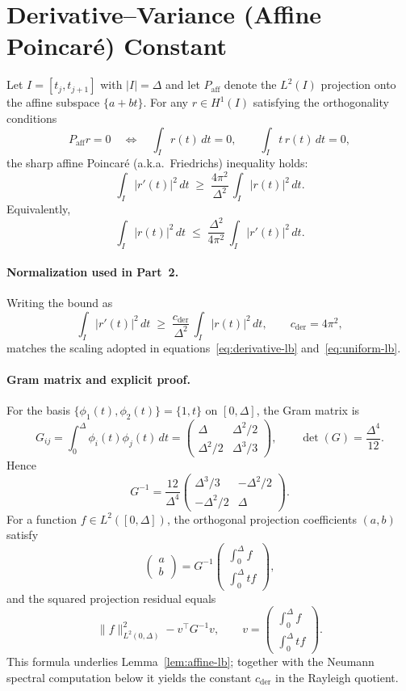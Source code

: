 \section{Derivative–Variance (Affine Poincaré) Constant}
\label{app:B}

Let $I=[t_j,t_{j+1}]$ with $|I|=\Delta$ and let $P_{\mathrm{aff}}$ denote the $L^2(I)$
projection onto the affine subspace $\{a+bt\}$. For any $r\in H^1(I)$ satisfying the
orthogonality conditions
\[
P_{\mathrm{aff}} r = 0
\quad\Longleftrightarrow\quad
\int_I r(t)\,dt=0,\qquad \int_I t\,r(t)\,dt=0,
\]
the sharp affine Poincaré (a.k.a.\ Friedrichs) inequality holds:
\begin{equation}
\int_I |r'(t)|^2\,dt \;\ge\; \frac{4\pi^2}{\Delta^2}\,\int_I |r(t)|^2\,dt.
\label{eq:affine-poincare}
\end{equation}
Equivalently,
\[
\int_I |r(t)|^2\,dt \;\le\; \frac{\Delta^2}{4\pi^2}\,\int_I |r'(t)|^2\,dt.
\]

\paragraph{Normalization used in Part~2.}
Writing the bound as
\begin{equation}
\int_I |r'(t)|^2\,dt \;\ge\; \frac{c_{\mathrm{der}}}{\Delta^2}\,\int_I |r(t)|^2\,dt,
\qquad c_{\mathrm{der}}=4\pi^2,
\label{eq:cder}
\end{equation}
matches the scaling adopted in equations~\eqref{eq:derivative-lb} and~\eqref{eq:uniform-lb}.

\paragraph{Gram matrix and explicit proof.}
For the basis $\{\phi_1(t),\phi_2(t)\}=\{1,t\}$ on $[0,\Delta]$, the Gram matrix is
\[
G_{ij}=\int_0^\Delta \phi_i(t)\phi_j(t)\,dt
=\begin{pmatrix}\Delta & \Delta^2/2\\ \Delta^2/2 & \Delta^3/3\end{pmatrix},
\qquad
\det(G)=\frac{\Delta^4}{12}.
\]
Hence
\[
G^{-1}=\frac{12}{\Delta^4}
\begin{pmatrix}\Delta^3/3 & -\Delta^2/2\\ -\Delta^2/2 & \Delta\end{pmatrix}.
\]
For a function $f\in L^2([0,\Delta])$, the orthogonal projection coefficients $(a,b)$ satisfy
\[
\begin{pmatrix}a\\b\end{pmatrix}
=G^{-1}\begin{pmatrix}\int_0^\Delta f\\ \int_0^\Delta tf\end{pmatrix},
\]
and the squared projection residual equals
\[
\|f\|^2_{L^2(0,\Delta)} - v^\top G^{-1} v,
\qquad v=\begin{pmatrix}\int_0^\Delta f\\ \int_0^\Delta tf\end{pmatrix}.
\]
This formula underlies Lemma~\ref{lem:affine-lb}; together with the Neumann
spectral computation below it yields the constant $c_{\mathrm{der}}$ in the
Rayleigh quotient.

